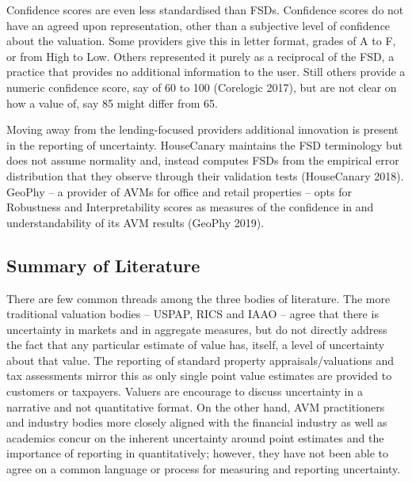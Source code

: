 \documentclass[colTwo]{anon}
\theoremstyle{definition}
\begin{document}
Confidence scores are even less standardised than FSDs.  Confidence scores do not have an agreed upon representation, other than a subjective level of confidence about the valuation.  Some providers give this in letter format, grades of A to F, or from High to Low.  Others represented it purely as a reciprocal of the FSD, a practice that provides no additional information to the user.  Still others provide a numeric confidence score, say of 60 to 100 (Corelogic 2017), but are not clear on how a value of, say 85 might differ from 65.  

Moving away from the lending-focused providers additional innovation is present in the reporting of uncertainty.  HouseCanary maintains the FSD terminology but does not assume normality and, instead computes FSDs from the empirical error distribution that they observe through their validation tests (HouseCanary 2018).  GeoPhy -- a provider of AVMs for office and retail properties -- opts for Robustness and Interpretability scores as measures of the confidence in and understandability of its AVM results (GeoPhy 2019).  

\subsection{Summary of Literature}

There are few common threads among the three bodies of literature.  The more traditional valuation bodies -- USPAP, RICS and IAAO -- agree that there is uncertainty in markets and in aggregate measures, but do not directly address the fact that any particular estimate of value has, itself, a level of uncertainty about that value.  The reporting of standard property appraisals/valuations and tax assessments mirror this as only single point value estimates are provided to customers or taxpayers. Valuers are encourage to discuss uncertainty in a narrative and not quantitative format. On the other hand, AVM practitioners and industry bodies more closely aligned with the financial industry as well as academics concur on the inherent uncertainty around point estimates and the importance of reporting in quantitatively; however, they have not been able to agree on a common language or process for measuring and reporting uncertainty. 
\end{document}
